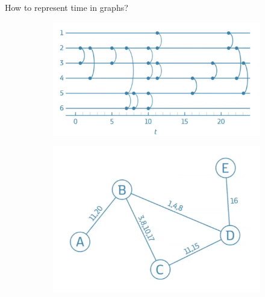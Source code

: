 \documentclass{beamer}
\begin{document}
\begin{frame}{How to represent time in graphs?}
    \centering
    \begin{figure}
        \begin{subfigure}{0.45\textwidth}
            \centering
            \includegraphics[width=\textwidth]{media/temporal_sense_1.png}
        \end{subfigure}
        \hfill
        \begin{subfigure}{0.45\textwidth}
            \centering
            \includegraphics[width=\textwidth]{media/temporal_sense_2.png}
        \end{subfigure}

        \vspace{0.5cm} %


\end{figure}
\end{frame}
\end{document}
